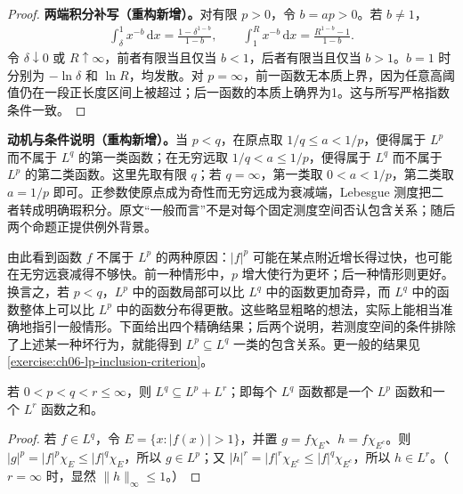 \documentclass[../../main.tex]{subfiles}
\begin{document}
\begin{proof}
\textbf{两端积分补写（重构新增）。}对有限 $p>0$，令 $b=ap>0$。若 $b\ne1$，
\begin{align*}
\int_\delta^1x^{-b}\,\mathrm dx=\frac{1-\delta^{1-b}}{1-b},
\qquad
\int_1^Rx^{-b}\,\mathrm dx=\frac{R^{1-b}-1}{1-b}.
\end{align*}
令 $\delta\downarrow0$ 或 $R\uparrow\infty$，前者有限当且仅当 $b<1$，后者有限当且仅当 $b>1$。$b=1$ 时分别为 $-\ln\delta$ 和 $\ln R$，均发散。对 $p=\infty$，前一函数无本质上界，因为任意高阈值仍在一段正长度区间上被超过；后一函数的本质上确界为1。这与所写严格指数条件一致。
\end{proof}
\begin{remark}
\textbf{动机与条件说明（重构新增）。}当 $p<q$，在原点取 $1/q\leqslant a<1/p$，便得属于 $L^p$ 而不属于 $L^q$ 的第一类函数；在无穷远取 $1/q<a\leqslant1/p$，便得属于 $L^q$ 而不属于 $L^p$ 的第二类函数。这里先取有限 $q$；若 $q=\infty$，第一类取 $0<a<1/p$，第二类取 $a=1/p$ 即可。正参数使原点成为奇性而无穷远成为衰减端，Lebesgue 测度把二者转成明确瑕积分。原文“一般而言”不是对每个固定测度空间否认包含关系；随后两个命题正提供例外背景。
\end{remark}
由此看到函数 $f$ 不属于 $L^p$ 的两种原因：$|f|^p$ 可能在某点附近增长得过快，也可能在无穷远衰减得不够快。前一种情形中，$p$ 增大使行为更坏；后一种情形则更好。换言之，若 $p<q$，$L^p$ 中的函数局部可以比 $L^q$ 中的函数更加奇异，而 $L^q$ 中的函数整体上可以比 $L^p$ 中的函数分布得更散。这些略显粗略的想法，实际上能相当准确地指引一般情形。下面给出四个精确结果；后两个说明，若测度空间的条件排除了上述某一种坏行为，就能得到 $L^p\subseteq L^q$ 一类的包含关系。更一般的结果见\cref{exercise:ch06-lp-inclusion-criterion}。
\begin{proposition}\label{proposition:ch06-lp-sum-inclusion}
若 $0<p<q<r\leqslant\infty$，则 $L^q\subseteq L^p+L^r$；即每个 $L^q$ 函数都是一个 $L^p$ 函数和一个 $L^r$ 函数之和。
\end{proposition}
\begin{proof}
若 $f\in L^q$，令 $E=\{x:|f(x)|>1\}$，并置 $g=f\chi_E$、$h=f\chi_{E^c}$。则 $|g|^p=|f|^p\chi_E\leqslant|f|^q\chi_E$，所以 $g\in L^p$；又 $|h|^r=|f|^r\chi_{E^c}\leqslant|f|^q\chi_{E^c}$，所以 $h\in L^r$。（$r=\infty$ 时，显然 $\|h\|_\infty\leqslant1$。）
\end{proof}
\end{document}
